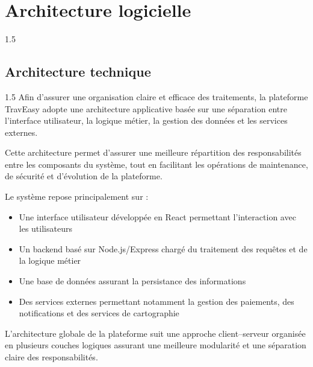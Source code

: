 \documentclass[a4paper,12pt]{report}
\begin{document}
\section{Architecture logicielle}
\vspace{0.5cm}
\begin{spacing}{1.5}
\justifying
\subsection{Architecture technique}
\vspace{0.5cm}
\begin{spacing}{1.5}
\justifying
Afin d'assurer une organisation claire et efficace des traitements, la plateforme TravEasy adopte une architecture applicative basée sur une séparation entre l'interface utilisateur, la logique métier, la gestion des données et les services externes.

Cette architecture permet d'assurer une meilleure répartition des responsabilités entre les composants du système, tout en facilitant les opérations de maintenance, de sécurité et d'évolution de la plateforme.

Le système repose principalement sur :

\begin{itemize}
    \item Une interface utilisateur développée en React permettant l'interaction avec les utilisateurs 
    \item Un backend basé sur Node.js/Express chargé du traitement des requêtes et de la logique métier 
    \item Une base de données assurant la persistance des informations 
    \item Des services externes permettant notamment la gestion des paiements, des notifications et des services de cartographie
\end{itemize}
\end{spacing}
\end{spacing}

L'architecture globale de la plateforme suit une approche client–serveur organisée en plusieurs couches logiques assurant une meilleure modularité et une séparation claire des responsabilités.
\end{document}
